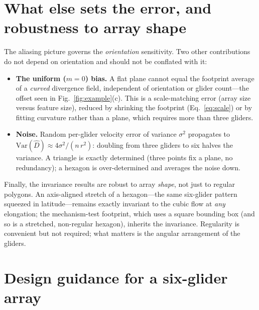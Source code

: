 \documentclass[11pt]{article}
\newcommand{\Dhat}{\widehat{D}}
\begin{document}
\section{What else sets the error, and robustness to array shape}
\label{sec:other}

The aliasing picture governs the \emph{orientation} sensitivity. Two other contributions do not
depend on orientation and should not be conflated with it:
\begin{itemize}[nosep,leftmargin=1.4em]
\item \textbf{The uniform ($m=0$) bias.} A flat plane cannot equal the footprint average of a
\emph{curved} divergence field, independent of orientation or glider count---the offset seen in
Fig.~\ref{fig:example}(c). This is a scale-matching error (array size versus feature size),
reduced by shrinking the footprint (Eq.~\ref{eq:scale}) or by fitting curvature rather than a
plane, which requires more than three gliders.
\item \textbf{Noise.} Random per-glider velocity error of variance $\sigma^2$ propagates to
$\mathrm{Var}(\Dhat)\approx 4\sigma^2/(n\,r^2)$: doubling from three gliders to six halves the
variance. A triangle is exactly determined (three points fix a plane, no redundancy); a hexagon
is over-determined and averages the noise down.
\end{itemize}
Finally, the invariance results are robust to array \emph{shape}, not just to regular polygons.
An axis-aligned stretch of a hexagon---the same six-glider pattern squeezed in latitude---remains
exactly invariant to the cubic flow at \emph{any} elongation; the mechanism-test footprint, which
uses a square bounding box (and so is a stretched, non-regular hexagon), inherits the invariance.
Regularity is convenient but not required; what matters is the angular arrangement of the
gliders.

\section{Design guidance for a six-glider array}
\label{sec:design}
\end{document}
